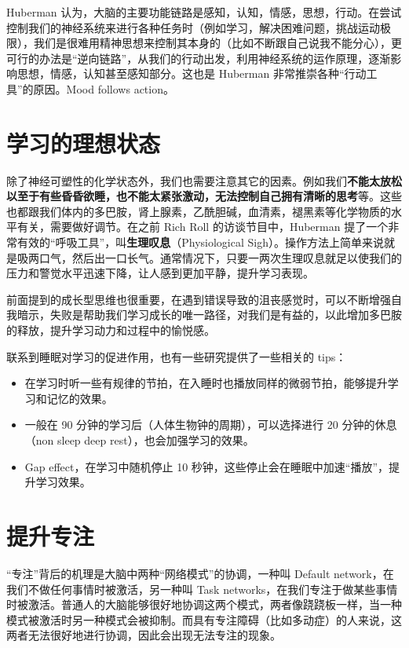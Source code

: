 \documentclass{report}
\begin{document}
Huberman 认为，大脑的主要功能链路是感知，认知，情感，思想，行动。在尝试控制我们的神经系统来进行各种任务时（例如学习，解决困难问题，挑战运动极限），我们是很难用精神思想来控制其本身的（比如不断跟自己说我不能分心），更可行的办法是“逆向链路”，从我们的行动出发，利用神经系统的运作原理，逐渐影响思想，情感，认知甚至感知部分。这也是 Huberman 非常推崇各种“行动工具”的原因。Mood follows action。

\section{学习的理想状态}

除了神经可塑性的化学状态外，我们也需要注意其它的因素。例如我们\textbf{不能太放松以至于有些昏昏欲睡，也不能太紧张激动，无法控制自己拥有清晰的思考}等。这些也都跟我们体内的多巴胺，肾上腺素，乙酰胆碱，血清素，褪黑素等化学物质的水平有关，需要做好调节。在之前 Rich Roll 的访谈节目中，Huberman 提了一个非常有效的“呼吸工具”，叫\textbf{生理叹息}（Physiological Sigh）。操作方法上简单来说就是吸两口气，然后出一口长气。通常情况下，只要一两次生理叹息就足以使我们的压力和警觉水平迅速下降，让人感到更加平静，提升学习表现。

前面提到的成长型思维也很重要，在遇到错误导致的沮丧感觉时，可以不断增强自我暗示，失败是帮助我们学习成长的唯一路径，对我们是有益的，以此增加多巴胺的释放，提升学习动力和过程中的愉悦感。

联系到睡眠对学习的促进作用，也有一些研究提供了一些相关的 tips：

\begin{itemize}
    \item 在学习时听一些有规律的节拍，在入睡时也播放同样的微弱节拍，能够提升学习和记忆的效果。
    \item 一般在 90 分钟的学习后（人体生物钟的周期），可以选择进行 20 分钟的休息（non sleep deep rest），也会加强学习的效果。
    \item Gap effect，在学习中随机停止 10 秒钟，这些停止会在睡眠中加速“播放”，提升学习效果。
\end{itemize}

\section{提升专注}

“专注”背后的机理是大脑中两种“网络模式”的协调，一种叫 Default network，在我们不做任何事情时被激活，另一种叫 Task networks，在我们专注于做某些事情时被激活。普通人的大脑能够很好地协调这两个模式，两者像跷跷板一样，当一种模式被激活时另一种模式会被抑制。而具有专注障碍（比如多动症）的人来说，这两者无法很好地进行协调，因此会出现无法专注的现象。
\end{document}
